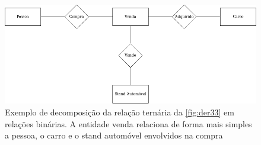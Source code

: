 \documentclass[11pt,twoside,a4paper]{report}
\begin{document}
\vspace{1cm}
\begin{figure}[H]
	\begin{center}
		\includegraphics[width=.75\textwidth]{notacao6} %
		\caption[Exemplo de decomposição de uma relação ternária em relações binárias]{Exemplo de decomposição da relação ternária da \autoref{fig:der33} em relações binárias. A entidade venda relaciona de forma mais simples a pessoa, o carro e o stand automóvel envolvidos na compra}
		\label{fig:der4}
	\end{center}
\end{figure}
\end{document}
